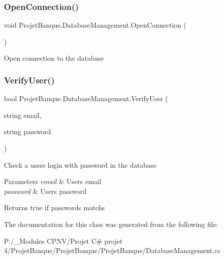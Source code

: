 \subsubsection{\texorpdfstring{OpenConnection()}{OpenConnection()}}
{\footnotesize\ttfamily void Projet\+Banque.\+Database\+Management.\+Open\+Connection (\begin{DoxyParamCaption}{ }\end{DoxyParamCaption})}



Open connection to the database 

\mbox{\label{class_projet_banque_1_1_database_management_a2b1815dc73339c7abbe63e2b8403143d}} 
\subsubsection{\texorpdfstring{VerifyUser()}{VerifyUser()}}
{\footnotesize\ttfamily bool Projet\+Banque.\+Database\+Management.\+Verify\+User (\begin{DoxyParamCaption}\item[{string}]{email,  }\item[{string}]{password }\end{DoxyParamCaption})}



Check a user\textquotesingle{}s login with password in the database 


\begin{DoxyParams}{Parameters}
{\em email} & User\textquotesingle{}s email\\
\hline
{\em password} & User\textquotesingle{}s password\\
\hline
\end{DoxyParams}
\begin{DoxyReturn}{Returns}
true if passwords matchs 
\end{DoxyReturn}


The documentation for this class was generated from the following file\+:\begin{DoxyCompactItemize}
\item 
P\+:/\+\_\+\+Modules C\+P\+N\+V/\+Projet C\# projet 4/\+Projet\+Banque/\+Projet\+Banque/\+Projet\+Banque/Database\+Management.\+cs\end{DoxyCompactItemize}
